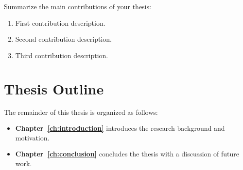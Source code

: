 Summarize the main contributions of your thesis:
\begin{enumerate}
  \item First contribution description.
  \item Second contribution description.
  \item Third contribution description.
\end{enumerate}

\section{Thesis Outline}
\label{sec:outline}

The remainder of this thesis is organized as follows:
\begin{itemize}
  \item \textbf{Chapter~\ref{ch:introduction}} introduces the research background and motivation.
  \item \textbf{Chapter~\ref{ch:conclusion}} concludes the thesis with a discussion of future work.
\end{itemize}

